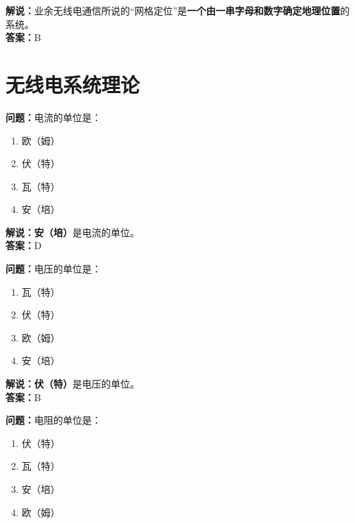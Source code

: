 \documentclass{ctexbook}
\begin{document}
\noindent\textbf{解说：}业余无线电通信所说的“网格定位”是\textbf{一个由一串字母和数字确定地理位置}的系统。\\\noindent\textbf{答案：}B








\chapter{无线电系统理论}




\noindent\textbf{问题：}电流的单位是：

\begin{enumerate}[label=\Alph*), leftmargin=3em]
	\item 欧（姆）
	\item 伏（特）
	\item 瓦（特）
	\item 安（培）
\end{enumerate}

\noindent\textbf{解说：}\textbf{安（培）}是电流的单位。\\\noindent\textbf{答案：}D


\bigskip


\noindent\textbf{问题：}电压的单位是：

\begin{enumerate}[label=\Alph*), leftmargin=3em]
	\item 瓦（特）
	\item 伏（特）
	\item 欧（姆）
	\item 安（培）
\end{enumerate}

\noindent\textbf{解说：伏（特）}是电压的单位。\\\noindent\textbf{答案：}B


\bigskip


\noindent\textbf{问题：}电阻的单位是：

\begin{enumerate}[label=\Alph*), leftmargin=3em]
	\item 伏（特）
	\item 瓦（特）
	\item 安（培）
	\item 欧（姆）
\end{enumerate}
\end{document}
